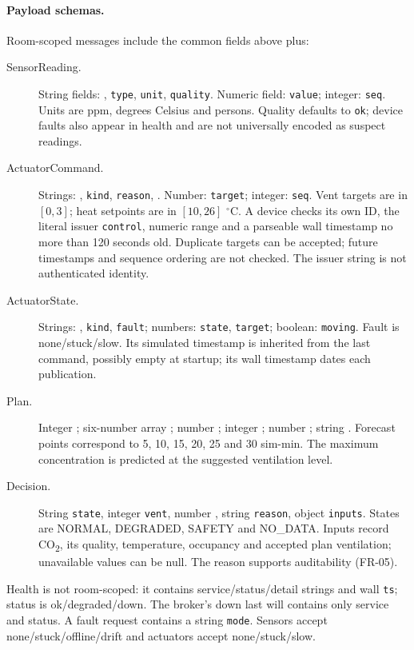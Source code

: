 \documentclass[11pt,a4paper]{article}
\begin{document}
\paragraph{Payload schemas.}
Room-scoped messages include the common fields above plus:
\begin{description}
\item[SensorReading.] String fields: \protect{}, \texttt{type}, \texttt{unit}, \texttt{quality}. Numeric field: \texttt{value}; integer: \texttt{seq}. Units are ppm, degrees Celsius and persons. Quality defaults to \texttt{ok}; device faults also appear in health and are not universally encoded as suspect readings.
\item[ActuatorCommand.] Strings: \protect{}, \texttt{kind}, \texttt{reason}, \protect{}. Number: \texttt{target}; integer: \texttt{seq}. Vent targets are in $[0,3]$; heat setpoints are in $[10,26]$ $^\circ$C. A device checks its own ID, the literal issuer \texttt{control}, numeric range and a parseable wall timestamp no more than 120 seconds old. Duplicate targets can be accepted; future timestamps and sequence ordering are not checked. The issuer string is not authenticated identity.
\item[ActuatorState.] Strings: \protect{}, \texttt{kind}, \texttt{fault}; numbers: \texttt{state}, \texttt{target}; boolean: \texttt{moving}. Fault is none/stuck/slow. Its simulated timestamp is inherited from the last command, possibly empty at startup; its wall timestamp dates each publication.
\item[Plan.] Integer \protect{}; six-number array \protect{}; number \protect{}; integer \protect{}; number \protect{}; string \protect{}. Forecast points correspond to 5, 10, 15, 20, 25 and 30 sim-min. The maximum concentration is predicted at the suggested ventilation level.
\item[Decision.] String \texttt{state}, integer \texttt{vent}, number \protect{}, string \texttt{reason}, object \texttt{inputs}. States are NORMAL, DEGRADED, SAFETY and NO\_DATA. Inputs record CO\textsubscript{2}, its quality, temperature, occupancy and accepted plan ventilation; unavailable values can be null. The reason supports auditability (FR-05).
\end{description}
Health is not room-scoped: it contains service/status/detail strings and wall \texttt{ts}; status is ok/degraded/down. The broker's down last will contains only service and status. A fault request contains a string \texttt{mode}. Sensors accept none/stuck/offline/drift and actuators accept none/stuck/slow.
\end{document}
